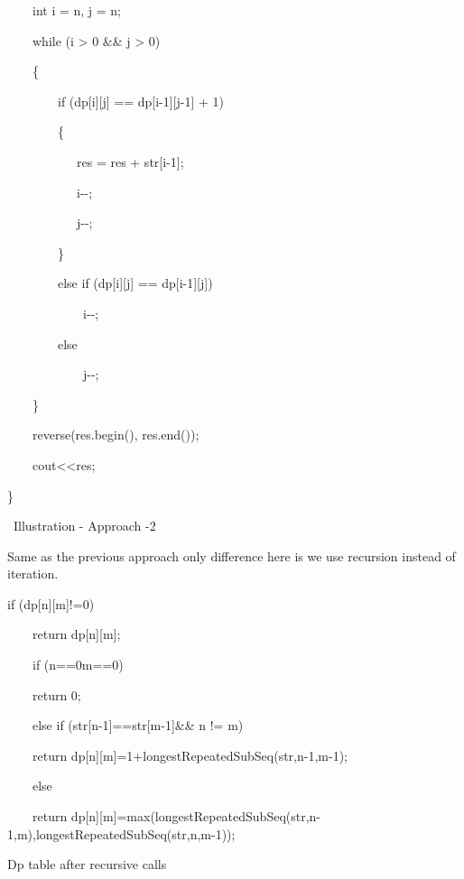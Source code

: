 \documentclass[letterpaper]{article}
\begin{document}
\begin{multicols}{2}
\ \ \ \ int i = n, j = n;

\ \ \ \ while (i {\textgreater} 0 \&\& j {\textgreater} 0)

\ \ \ \ \{


\bigskip

\ \ \ \ \ \ \ \ if (dp[i][j] == dp[i-1][j-1] + 1)

\ \ \ \ \ \ \ \ \{

\ \ \ \ \ \ \ \ \ \ \ res = res + str[i-1];

\ \ \ \ \ \ \ \ \ \ \ i-{}-;

\ \ \ \ \ \ \ \ \ \ \ j-{}-;

\ \ \ \ \ \ \ \ \}


\bigskip

\ \ \ \ \ \ \ \ else if (dp[i][j] == dp[i-1][j])

\ \ \ \ \ \ \ \ \ \ \ \ i-{}-;

\ \ \ \ \ \ \ \ else

\ \ \ \ \ \ \ \ \ \ \ \ j-{}-;

\ \ \ \ \}


\bigskip


\bigskip

\ \ \ \ reverse(res.begin(), res.end());


\bigskip


\bigskip

\ \ \ \ cout{\textless}{\textless}res;

\}


\bigskip

\ Illustration - Approach -2 

Same as the previous approach only difference here is we use recursion instead of iteration.

if (dp[n][m]!=0)

\ \ \ \ return dp[n][m];

\ \ \ \ if (n==0{\textbar}{\textbar}m==0)

\ \ \ \ return 0;

\ \ \ \ else if (str[n-1]==str[m-1]\&\& n != m)

\ \ \ \ return dp[n][m]=1+longestRepeatedSubSeq(str,n-1,m-1);

\ \ \ \ else

\ \ \ \ return dp[n][m]=max(longestRepeatedSubSeq(str,n-1,m),longestRepeatedSubSeq(str,n,m-1));


\bigskip

Dp table after recursive calls


\bigskip

\begin{table}
\raggedright
\begin{tabular}{|m{0.68cm}|m{0.611cm}|m{0.68200004cm}|m{0.788cm}|m{0.68200004cm}|m{0.611cm}|m{0.53900003cm}|m{0.68200004cm}|m{0.544cm}|}


\end{tabular}
\end{table}
\end{multicols}
\end{document}

